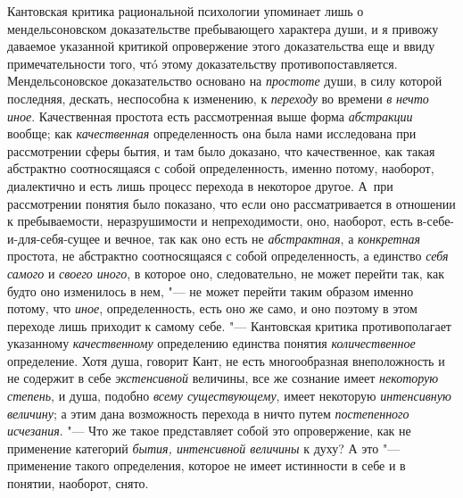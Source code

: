 {{Кантовская критика рациональной психологии упоминает лишь о
мендельсоновском доказательстве пребывающего характера души, и я привожу
даваемое указанной критикой опровержение этого доказательства еще и ввиду
примечательности того, чтó этому доказательству
противопоставляется.
Мендельсоновское доказательство основано на {\em простоте} души, в
силу которой последняя, дескать, неспособна к изменению, к
{\em переходу} во времени {\em в} {\em нечто иное}.
Качественная простота есть рассмотренная выше форма
{\em абстракции} вообще; как {\em качественная}
определенность она была нами исследована при рассмотрении
сферы бытия, и там было доказано, что качественное, как такая абстрактно
соотносящаяся с собой определенность, именно потому, наоборот, диалектично
и есть лишь процесс перехода в некоторое другое. А~при рассмотрении понятия
было показано, что если оно рассматривается в отношении к пребываемости,
неразрушимости и непреходимости, оно, наоборот, есть
в-себе-и-для-себя-сущее и вечное, так как оно есть не
{\em абстрактная}, а {\em конкретная}
простота, не абстрактно соотносящаяся с собой определенность,
а единство {\em себя самого} и {\em своего иного},
в которое оно, следовательно, не может перейти так,
как будто оно изменилось в нем, "--- не может перейти таким
образом именно потому, что {\em иное},
определенность, есть оно же само, и оно поэтому в этом
переходе лишь приходит к самому себе. "--- Кантовская критика
противополагает указанному {\em качественному}
определению единства понятия {\em количественное}
определение. Хотя душа, говорит Кант, не есть многообразная
внеположность и не содержит в себе {\em экстенсивной}
величины, все же сознание имеет {\em некоторую степень},
и душа, подобно {\em всему существующему}, имеет некоторую
{\em интенсивную величину}; а этим дана возможность перехода в ничто путем
{\em постепенного исчезания}. "---
Что же такое представляет собой это опровержение, как не
применение категорий {\em бытия, интенсивной величины} к духу? А это
"--- применение такого определения, которое не имеет истинности
в себе и в понятии, наоборот, снято.

}}
